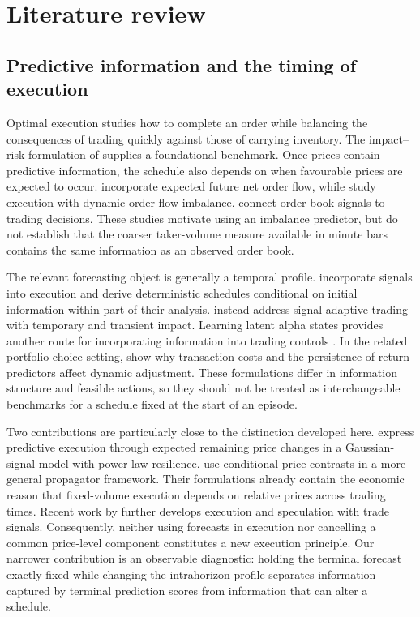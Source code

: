 \section{Literature review}
\label{sec:literature}
\subsection{Predictive information and the timing of execution}
Optimal execution studies how to complete an order while balancing the consequences of trading quickly against those of carrying inventory. The impact--risk formulation of \citet{almgren2001} supplies a foundational benchmark. Once prices contain predictive information, the schedule also depends on when favourable prices are expected to occur. \citet{cartea2016} incorporate expected future net order flow, while \citet{bechler2015} study execution with dynamic order-flow imbalance. \citet{cartea2018} connect order-book signals to trading decisions. These studies motivate using an imbalance predictor, but do not establish that the coarser taker-volume measure available in minute bars contains the same information as an observed order book.

The relevant forecasting object is generally a temporal profile. \citet{lehalle2019} incorporate signals into execution and derive deterministic schedules conditional on initial information within part of their analysis. \citet{neuman2022} instead address signal-adaptive trading with temporary and transient impact. Learning latent alpha states provides another route for incorporating information into trading controls \citep{casgrain2019}. In the related portfolio-choice setting, \citet{garleanu2013} show why transaction costs and the persistence of return predictors affect dynamic adjustment. These formulations differ in information structure and feasible actions, so they should not be treated as interchangeable benchmarks for a schedule fixed at the start of an episode.

Two contributions are particularly close to the distinction developed here. \citet{forde2022} express predictive execution through expected remaining price changes in a Gaussian-signal model with power-law resilience. \citet{abijaber2025} use conditional price contrasts in a more general propagator framework. Their formulations already contain the economic reason that fixed-volume execution depends on relative prices across trading times. Recent work by \citet{bank2026} further develops execution and speculation with trade signals. Consequently, neither using forecasts in execution nor cancelling a common price-level component constitutes a new execution principle. Our narrower contribution is an observable diagnostic: holding the terminal forecast exactly fixed while changing the intrahorizon profile separates information captured by terminal prediction scores from information that can alter a schedule.

